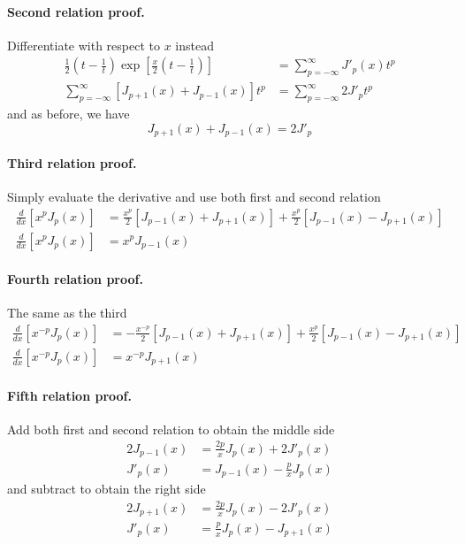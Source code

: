 \documentclass[../main.tex]{subfiles}
\begin{document}
\paragraph*{Second relation proof.} Differentiate with respect to $x$ instead
\begin{align*}
    \frac{1}{2}\left(t-\frac{1}{t}\right)\exp\left[\frac{x}{2}\left(t-\frac{1}{t}\right)\right] & =\sum_{p=-\infty}^{\infty}J'_p(x)t^{p} \\
    \sum_{p=-\infty}^{\infty}\left[J_{p+1}(x)+J_{p-1}(x)\right]t^p                              & = \sum_{p=-\infty}^{\infty}2J'_pt^{p}
\end{align*}
and as before, we have
\begin{equation*}
    J_{p+1}(x)+J_{p-1}(x)=2J'_p
\end{equation*}

\paragraph*{Third relation proof.} Simply evaluate the derivative and use both first and second relation
\begin{align*}
    \frac{d}{dx}\left[x^pJ_p(x)\right] & = \frac{x^p}{2}\left[J_{p-1}(x)+J_{p+1}(x)\right]+\frac{x^p}{2}\left[J_{p-1}(x)-J_{p+1}(x)\right] \\
    \frac{d}{dx}\left[x^pJ_p(x)\right] & =x^pJ_{p-1}(x)
\end{align*}

\paragraph*{Fourth relation proof.} The same as the third
\begin{align*}
    \frac{d}{dx}\left[x^{-p}J_p(x)\right] & = -\frac{x^{-p}}{2}\left[J_{p-1}(x)+J_{p+1}(x)\right]+\frac{x^p}{2}\left[J_{p-1}(x)-J_{p+1}(x)\right] \\
    \frac{d}{dx}\left[x^{-p}J_p(x)\right] & =x^{-p}J_{p+1}(x)
\end{align*}

\paragraph*{Fifth relation proof.} Add both first and second relation to obtain the middle side
\begin{align*}
    2J_{p-1}(x) & =\frac{2p}{x}J_p(x)+2J'_p(x)  \\
    J'_{p}(x)   & =J_{p-1}(x)-\frac{p}{x}J_p(x)
\end{align*}
and subtract to obtain the right side
\begin{align*}
    2J_{p+1}(x) & =\frac{2p}{x}J_p(x)-2J'_p(x)  \\
    J'_{p}(x)   & =\frac{p}{x}J_p(x)-J_{p+1}(x)
\end{align*}
\end{document}
